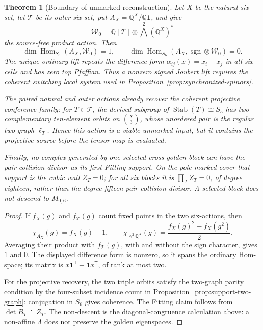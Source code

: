 \documentclass[11pt]{article}
\newtheorem{theorem}{Theorem}[section]
\theoremstyle{definition}
\theoremstyle{remark}
\newcommand{\cT}{\mathcal T}
\begin{document}
\begin{theorem}[Boundary of unmarked reconstruction]
\label{thm:unmarked-boundary}
Let \(X\) be the natural six-set, let \(\cT\) be its outer six-set, put
\(A_X=\mathbb Q^X/\mathbb Q\mathbf1\), and give
\[
 \mathcal W_0=\mathbb Q[\cT]\otimes
              \bigwedge^2(\mathbb Q^X)^*
\]
the source-free product action.  Then
\[
 \dim\operatorname{Hom}_{S_6}(A_X,\mathcal W_0)=1,
 \qquad
 \dim\operatorname{Hom}_{S_6}
 (A_X,\operatorname{sgn}\otimes\mathcal W_0)=0.
\]
The unique ordinary lift repeats the difference form
\(\alpha_{ij}(x)=x_i-x_j\) in all six cells and has zero top Pfaffian.
Thus a nonzero signed Joubert lift requires the coherent switching local
system used in Proposition~\ref{prop:synchronized-spinors}.

The paired natural and outer actions already recover the coherent projective
conference family: for \(T\in\cT\), the derived subgroup of
\(\operatorname{Stab}(T)\cong S_5\) has two complementary ten-element
orbits on \(\binom X3\), whose unordered pair is the regular two-graph
\(\ell_T\).  Hence this action is a viable unmarked input, but it contains
the projective source before the tensor map is evaluated.

Finally, no complex generated by one selected cross-golden block can have
the pair-collision divisor as its first Fitting support.  On the pole-marked
cover that support is the cubic wall \(Z_T=0\); for all six blocks it is
\(\prod_TZ_T=0\), of degree eighteen, rather than the degree-fifteen
pair-collision divisor.  A selected block does not descend to \(M_{0,6}\).
\end{theorem}

\begin{proof}
If \(f_X(g)\) and \(f_{\cT}(g)\) count fixed points in the two six-actions,
then
\[
 \chi_{A_X}(g)=f_X(g)-1,
 \qquad
 \chi_{\wedge^2\mathbb Q^X}(g)
 =\frac{f_X(g)^2-f_X(g^2)}2.
\]
Averaging their product with \(f_{\cT}(g)\), with and without the sign
character, gives \(1\) and \(0\).  The displayed difference form is nonzero,
so it spans the ordinary Hom-space; its matrix is
\(x\mathbf1^{\mathsf T}-\mathbf1x^{\mathsf T}\), of rank at most two.

For the projective recovery, the two triple orbits satisfy the two-graph
parity condition by the four-subset incidence count in
Proposition~\ref{prop:support-two-graph}; conjugation in \(S_6\) gives
coherence.  The Fitting claim follows from
\(\det B_T\doteq Z_T\).  The non-descent is the diagonal-congruence
calculation above: a non-affine \(\Lambda\) does not preserve the golden
eigenspaces.
\end{proof}
\end{document}
